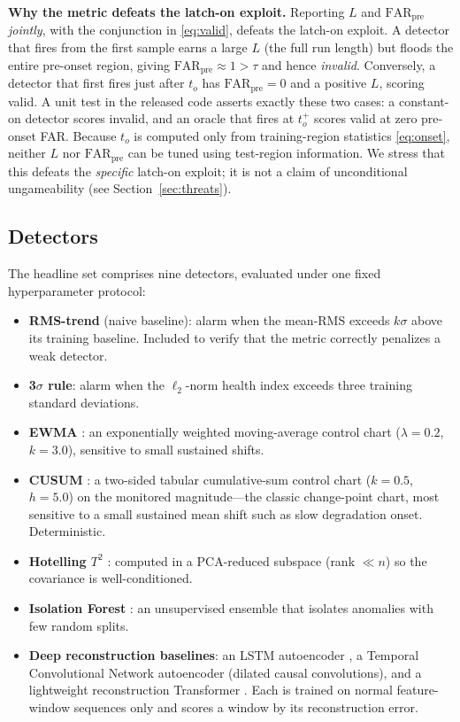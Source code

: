 \documentclass[journal]{IEEEtran}
\begin{document}
\textbf{Why the metric defeats the latch-on exploit.} Reporting $L$ and
$\mathrm{FAR}_{\mathrm{pre}}$ \emph{jointly}, with the conjunction in
\eqref{eq:valid}, defeats the latch-on exploit. A detector that fires from the
first sample earns a large $L$ (the full run length) but floods the entire
pre-onset region, giving $\mathrm{FAR}_{\mathrm{pre}}\!\approx\!1 > \tau$ and
hence \emph{invalid}. Conversely, a detector that first fires just after $t_o$
has $\mathrm{FAR}_{\mathrm{pre}}{=}0$ and a positive $L$, scoring valid. A unit
test in the released code asserts exactly these two cases: a constant-on
detector scores invalid, and an oracle that fires at $t_o^{+}$ scores valid at
zero pre-onset FAR. Because $t_o$ is computed only from training-region
statistics \eqref{eq:onset}, neither $L$ nor $\mathrm{FAR}_{\mathrm{pre}}$ can
be tuned using test-region information. We stress that this defeats the
\emph{specific} latch-on exploit; it is not a claim of unconditional
ungameability (see Section~\ref{sec:threats}).

\subsection{Detectors}
The headline set comprises nine detectors, evaluated under one fixed hyperparameter protocol:
\begin{itemize}
\item \textbf{RMS-trend} (naive baseline): alarm when the mean-RMS exceeds
$k\sigma$ above its training baseline. Included to verify that the metric
correctly penalizes a weak detector.
\item \textbf{3$\sigma$ rule}: alarm when the $\ell_2$-norm health index exceeds
three training standard deviations.
\item \textbf{EWMA} \cite{roberts1959}: an exponentially weighted moving-average
control chart ($\lambda{=}0.2$, $k{=}3.0$), sensitive to small sustained shifts.
\item \textbf{CUSUM} \cite{page1954}: a two-sided tabular cumulative-sum control
chart ($k{=}0.5$, $h{=}5.0$) on the monitored magnitude---the classic
change-point chart, most sensitive to a small sustained mean shift such as slow
degradation onset. Deterministic.
\item \textbf{Hotelling $T^2$} \cite{hotelling1947}: computed in a PCA-reduced
subspace (rank $\ll n$) so the covariance is well-conditioned.
\item \textbf{Isolation Forest} \cite{liu2008}: an unsupervised ensemble that
isolates anomalies with few random splits.
\item \textbf{Deep reconstruction baselines}: an LSTM autoencoder
\cite{malhotra2016}, a Temporal Convolutional Network autoencoder (dilated
causal convolutions), and a lightweight reconstruction Transformer
\cite{vaswani2017}. Each is trained on normal feature-window sequences only and
scores a window by its reconstruction error.
\end{itemize}
\end{document}
